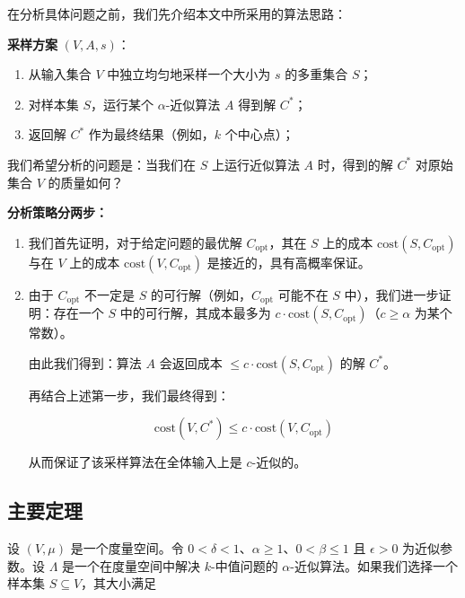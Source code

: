 \documentclass[lang=cn,newtx,10pt,scheme=chinese,chinesefont=nofont,citestyle=gb7714-2015, bibstyle=gb7714-2015]{elegantbook}
\begin{document}
\begin{refsection}
在分析具体问题之前，我们先介绍本文中所采用的算法思路：

\vspace{1em}
\noindent \textbf{采样方案} $(V, A, s)$：
\begin{enumerate}[label=\arabic*.]
  \item 从输入集合 $V$ 中独立均匀地采样一个大小为 $s$ 的多重集合 $S$；
  \item 对样本集 $S$，运行某个 $\alpha$-近似算法 $A$ 得到解 $C^*$；
  \item 返回解 $C^*$ 作为最终结果（例如，$k$ 个中心点）；
\end{enumerate}

我们希望分析的问题是：当我们在 $S$ 上运行近似算法 $A$ 时，得到的解 $C^*$ 对原始集合 $V$ 的质量如何？

\vspace{1em}
\noindent \textbf{分析策略分两步：}

\begin{enumerate}[label=\arabic*.]
  \item 我们首先证明，对于给定问题的最优解 $C_{\text{opt}}$，其在 $S$ 上的成本 $\text{cost}(S, C_{\text{opt}})$ 与在 $V$ 上的成本 $\text{cost}(V, C_{\text{opt}})$ 是接近的，具有高概率保证。

  \item 由于 $C_{\text{opt}}$ 不一定是 $S$ 的可行解（例如，$C_{\text{opt}}$ 可能不在 $S$ 中），我们进一步证明：存在一个 $S$ 中的可行解，其成本最多为 $c \cdot \text{cost}(S, C_{\text{opt}})$（$c \ge \alpha$ 为某个常数）。

  由此我们得到：算法 $A$ 会返回成本 $\le c \cdot \text{cost}(S, C_{\text{opt}})$ 的解 $C^*$。

  再结合上述第一步，我们最终得到：
  

\[
    \text{cost}(V, C^*) \le c \cdot \text{cost}(V, C_{\text{opt}})
  \]


  从而保证了该采样算法在全体输入上是 $c$-近似的。
\end{enumerate}




\subsection{主要定理}

\begin{tcolorbox}[colback=gray!5,colframe=black!80!white,title=定理 1]
设 $(V, \mu)$ 是一个度量空间。令 $0 < \delta < 1$、$\alpha \geq 1$、$0 < \beta \leq 1$ 且 $\epsilon > 0$ 为近似参数。设 $\Lambda$ 是一个在度量空间中解决 $k$-中值问题的 $\alpha$-近似算法。如果我们选择一个样本集 $S \subseteq V$，其大小满足




\end{tcolorbox}
\end{refsection}
\end{document}
